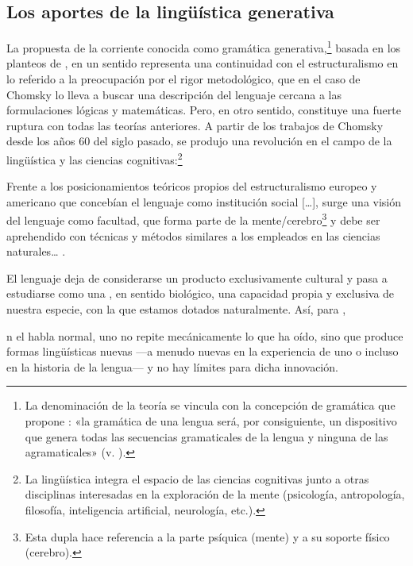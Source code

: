 \subsection{Los aportes de la lingüística generativa}\label{sec:01-generativa}

La propuesta de la corriente conocida como gramática
generativa,\footnote{La denominación de la teoría se vincula con la concepción
de gramática que propone \textcite{chomsky1974a}: «la gramática de una lengua
será, por consiguiente, un dispositivo que genera todas las secuencias
gramaticales de la lengua y ninguna de las agramaticales» (v. ).}
basada en los planteos de \textcite{chomsky1970,chomsky1974a}, en un sentido
representa una continuidad con el estructuralismo en lo referido a la
preocupación por el rigor metodológico, que en el caso de Chomsky lo lleva a
buscar una descripción del lenguaje cercana a las formulaciones lógicas y
matemáticas. Pero, en otro sentido, constituye una fuerte ruptura con todas las
teorías anteriores. A partir de los trabajos de Chomsky desde los años 60 del
siglo pasado, se produjo una revolución en el campo de la lingüística y las
ciencias cognitivas:\footnote{La lingüística integra el espacio de las ciencias
cognitivas junto a otras disciplinas interesadas en la exploración de la mente
(psicología, antropología, filosofía, inteligencia artificial, neurología,
etc.).}

\begin{cita}
Frente a los posicionamientos teóricos propios del estructuralismo europeo y
americano que concebían el lenguaje como institución social [\ldots], surge una
visión del lenguaje como facultad, que forma parte de la
mente/cerebro\footnote{Esta dupla hace referencia a la parte psíquica (mente) y
a su soporte físico (cerebro).} y debe ser aprehendido con técnicas y métodos
similares a los empleados en las ciencias naturales\ldots{}
\parencite[54]{mairal2012}.
\end{cita}

El lenguaje deja de considerarse un producto exclusivamente cultural y pasa a
estudiarse como una , en sentido biológico, una capacidad
propia y exclusiva de nuestra especie, con la que estamos dotados
naturalmente. Así, para \textcite[14]{chomsky1992},

\begin{cita}
[e]n el habla normal, uno no repite mecánicamente lo que ha oído, sino que
produce formas lingüísticas nuevas ---a menudo nuevas en la experiencia de uno
o incluso en la historia de la lengua--- y no hay límites para dicha
innovación.
\end{cita}


